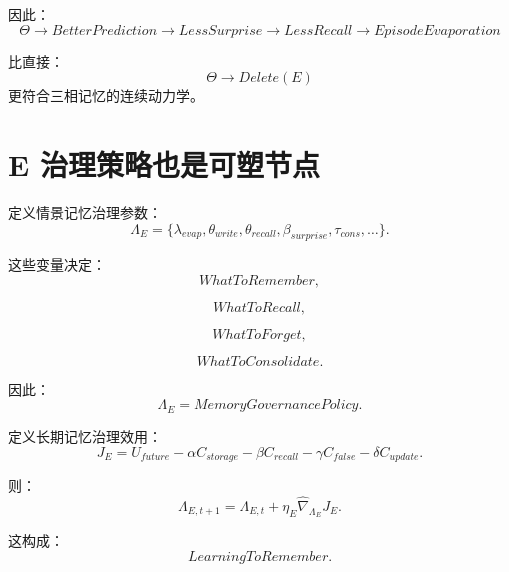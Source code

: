 因此：
\begin{equation}
\boxed{
\Theta
\rightarrow
BetterPrediction
\rightarrow
LessSurprise
\rightarrow
LessRecall
\rightarrow
EpisodeEvaporation
}
\end{equation}

比直接：
\begin{equation}
\Theta\rightarrow Delete(E)
\end{equation}
更符合三相记忆的连续动力学。


\section{E 治理策略也是可塑节点}

定义情景记忆治理参数：
\begin{equation}
\Lambda_E
=
\{
\lambda_{evap},
\theta_{write},
\theta_{recall},
\beta_{surprise},
\tau_{cons},
\ldots
\}.
\end{equation}

这些变量决定：
\begin{equation}
WhatToRemember,
\end{equation}

\begin{equation}
WhatToRecall,
\end{equation}

\begin{equation}
WhatToForget,
\end{equation}

\begin{equation}
WhatToConsolidate.
\end{equation}

因此：
\begin{equation}
\boxed{
\Lambda_E
=
MemoryGovernancePolicy.
}
\end{equation}

定义长期记忆治理效用：
\begin{equation}
J_E
=
U_{future}
-
\alpha C_{storage}
-
\beta C_{recall}
-
\gamma C_{false}
-
\delta C_{update}.
\end{equation}

则：
\begin{equation}
\Lambda_{E,t+1}
=
\Lambda_{E,t}
+
\eta_E
\widehat{\nabla}_{\Lambda_E}
J_E.
\end{equation}

这构成：
\begin{equation}
\boxed{
LearningToRemember.
}
\end{equation}


